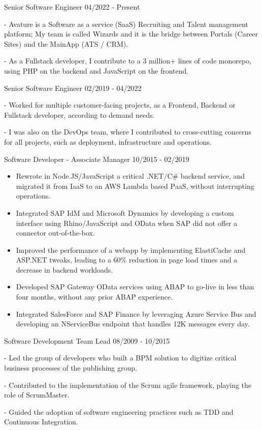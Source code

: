 \documentclass[11pt]{article} %
\begin{document}
\begin{description}
\squish
{}
           {Senior Software Engineer}
           {04/2022 - Present}

- Avature is a Software as a service (SaaS) Recruiting and Talent management platform; My team is called Wizards and it is the bridge between Portals (Career Sites) and the MainApp (ATS / CRM).

- As a Fullstack developer, I contribute to a 3 million+ lines of code monorepo, using PHP on the backend and JavaScript on the frontend.

           {Senior Software Engineer}
           {02/2019 - 04/2022}

- Worked for multiple customer-facing projects, as a Frontend, Backend or Fullstack developer, according to demand needs.

- I was also on the DevOps team, where I contributed to cross-cutting concerns for all projects, such as deployment, infrastructure and operations.

           {Software Developer - Associate Manager}
           {10/2015 - 02/2019}

\begin{itemize}
\item Rewrote in Node.JS/JavaScript a critical .NET/C\# backend service, and migrated it from IaaS to an AWS Lambda based PaaS, without interrupting operations.
\item Integrated SAP IdM and Microsoft Dynamics by developing a custom interface using Rhino/JavaScript and OData when SAP did not offer a connector out-of-the-box.
\item Improved the performance of a webapp by implementing ElastiCache and ASP.NET tweaks, leading to a 60\% reduction in page load times and a decrease in backend workloads.
\item Developed SAP Gateway OData services using ABAP to go-live in less than four months, without any prior ABAP experience.
\item Integrated SalesForce and SAP Finance by leveraging Azure Service Bus and developing an NServiceBus endpoint that handles 12K messages every day.
\end{itemize}

           {Software Development Team Lead}
           {08/2009 - 10/2015}

- Led the group of developers who built a BPM solution to digitize critical business processes of the publishing group.

- Contributed to the implementation of the Scrum agile framework, playing the role of ScrumMaster.

- Guided the adoption of software engineering practices such as TDD and Continuous Integration.

\end{description}
\end{document}
